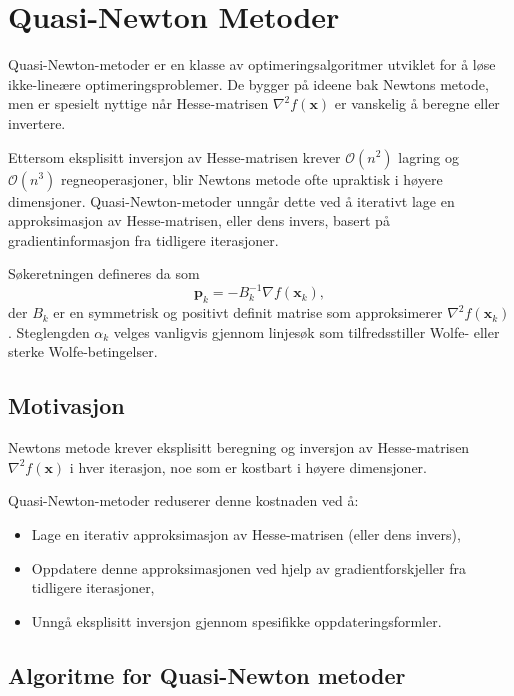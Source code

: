 \section{Quasi-Newton Metoder}
\label{sec:quasi_newton}

Quasi-Newton-metoder er en klasse av optimeringsalgoritmer utviklet for å løse ikke-lineære optimeringsproblemer. De bygger på ideene bak Newtons metode, men er spesielt nyttige når Hesse-matrisen \( \nabla^2 f(\symbf{x}) \) er vanskelig å beregne eller invertere.

Ettersom eksplisitt inversjon av Hesse-matrisen krever \( \mathcal{O}(n^2) \) lagring og \( \mathcal{O}(n^3) \) regneoperasjoner, blir Newtons metode ofte upraktisk i høyere dimensjoner.
Quasi-Newton-metoder unngår dette ved å iterativt lage en approksimasjon av Hesse-matrisen, eller dens invers, basert på gradientinformasjon fra tidligere iterasjoner.

Søkeretningen defineres da som
\[
	\symbf{p}_k = -B_k^{-1} \nabla f(\symbf{x}_k),
\]
der \( B_k \) er en symmetrisk og positivt definit matrise som approksimerer \( \nabla^2 f(\symbf{x}_k) \). Steglengden \( \alpha_k \) velges vanligvis gjennom linjesøk som tilfredsstiller Wolfe- eller sterke Wolfe-betingelser.

\subsection{Motivasjon}
Newtons metode krever eksplisitt beregning og inversjon av Hesse-matrisen \( \nabla^2 f(\symbf{x}) \) i hver iterasjon, noe som er kostbart i høyere dimensjoner.

Quasi-Newton-metoder reduserer denne kostnaden ved å:
\begin{itemize}
	\item Lage en iterativ approksimasjon av Hesse-matrisen (eller dens invers),
	\item Oppdatere denne approksimasjonen ved hjelp av gradientforskjeller fra tidligere iterasjoner,
	\item Unngå eksplisitt inversjon gjennom spesifikke oppdateringsformler.
\end{itemize}

\subsection{Algoritme for Quasi-Newton metoder}

